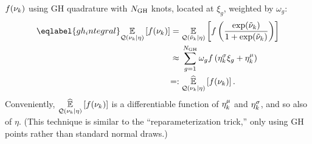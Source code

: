 $f(\nu_{k})$ using GH quadrature with $N_{\mathrm{GH}}$ knots,
located at $\xi_g$, weighted by $\omega_g$:
%
\begin{align}\eqlabel{gh_integral}
%
\expect{\q(\nuk \vert \eta)}{f(\nuk)} ={}&
\expect{\q(\lnu_\k \vert \eta)}
       {f\left(\frac{\exp(\lnu_\k)}{1 + \exp(\lnu_\k)}\right)}
\nonumber\\\approx{}&
    \sum_{g=1}^{\ngh} \omega_g f\left(\lnusd_\k \xi_{g} + \lnumean_\k\right)
 \nonumber\\=:{}&
\expecthat{\q(\nuk \vert \eta)}{f(\nuk)}.
%
\end{align}
%
Conveniently, $\underset{\mathcal{Q}(\nu_{k} \vert \eta)}{\widehat{\mathbb{E}}}\left[f(\nu_{k})\right]$ is a differentiable
function of $\eta^{\mu}_k$ and $\eta^{\sigma}_k$, and so also of $\eta$.  (This
technique is similar to the ``reparameterization trick,'' only using
GH points rather than standard normal draws.)
